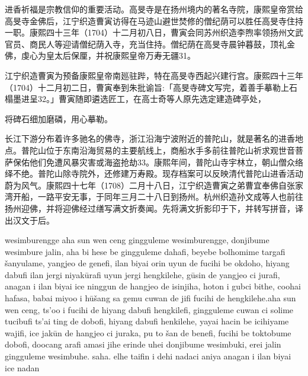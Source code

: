 进香祈福是宗教信仰的重要活动。高旻寺是在扬州境内的著名寺院，康熙皇帝赏给高旻寺金佛后，江宁织造曹寅访得在马迹山避世焚修的僧纪荫可以胜任高旻寺住持一职。康熙四十三年（1704）十二月初八日，曹寅会同苏州织造李煦率领扬州文武官员、商民人等迎请僧纪荫入寺，充当住持。僧纪荫在高旻寺晨钟暮鼓，顶礼金佛，虔心为皇太后保厘，并祝康熙皇帝万寿无疆31。

江宁织造曹寅为预备康熙皇帝南廵驻跸，特在高旻寺西起兴建行宫。康熙四十三年（1704）十二月初二日，曹寅奉到朱批谕旨:「高旻寺碑文写完，着善手摹勒上石榻墨进呈32。」曹寅随即遴选匠工，在高士奇等人原先选定建造碑亭处，

\vfill
\begin{BookNotes}
\end{BookNotes}

\noindent 将碑石细加磨磷，用心摹勒。

长江下游分布着许多驰名的佛寺，浙江沿海宁波附近的普陀山，就是著名的进香地点。普陀山位于东南沿海贸易的主要航线上，商船水手多前往普陀山祈求观世音菩萨保佑他们免遭风暴灾害或海盗抢劫33。康熙年间，普陀山寺宇林立，朝山僧众络绎不绝。普陀山除寺院外，还修建万寿殿。现存档案可以反映清代普陀山进香活动蔚为风气。康熙四十七年（1708）二月十八日，江宁织造曹寅之弟曹宜奉佛自张家湾开船，一路平安无事，于同年三月二十八日到扬州。杭州织造孙文成等人也前往扬州迎佛，并将迎佛经过缮写满文折奏闻。先将满文折影印于下，并转写拼音，译出汉文于后。

\vfill
\begin{BookNotes}
\end{BookNotes}







wesimburengge aha sun wen ceng gingguleme wesimburengge, donjibume wesimbure jalin, aha bi hese be gingguleme dahafi, beyebe bolhomime targafi šanyulame, yangjeo de genefi, ilan biyai orin uyun de fucihi be okdoho, hiyang dabufi ilan jergi niyakūrafi uyun jergi hengkilehe, gūsin de yangjeo ci jurafi, anagan i ilan biyai ice ninggun de hangjeo de isinjiha, hoton i gubci bithe, coohai hafasa, babai miyoo i hūšang sa gemu cuwan de jifi fucihi de hengkilehe.aha sun wen ceng, ts'oo i fucihi de hiyang dabufi hengkilefi, gingguleme cuwan ci solime tucibufi ts'ai ting de dobofi, hiyang dabufi henkilehe, yayai hacin be icihiyame wajifi, ice jakūn de hangjeo ci juraka, pu to šan de benefi, fucihi be toktobume dobofi, doocang arafi amasi jihe erinde uhei donjibume wesimbuki, erei jalin gingguleme wesimbuhe. saha. elhe taifin i dehi nadaci aniya anagan i ilan biyai ice nadan

